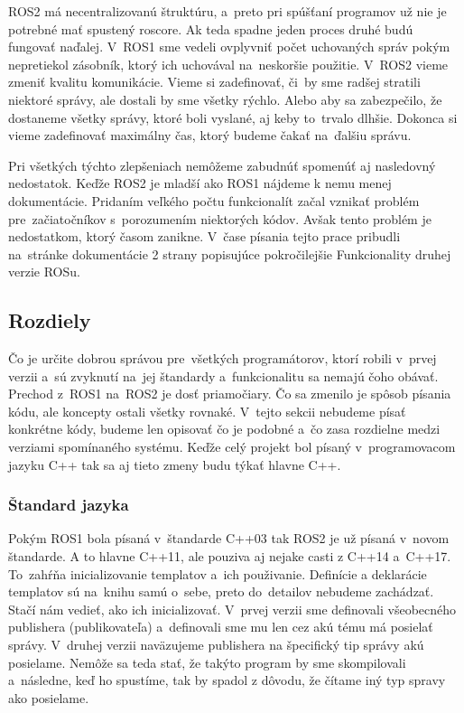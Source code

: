 ROS2 má necentralizovanú štruktúru, a~preto pri spúšťaní programov už nie je potrebné mať spustený roscore. Ak teda spadne jeden proces druhé budú
fungovať naďalej. V~ROS1 sme vedeli ovplyvniť počet uchovaných správ pokým nepretiekol zásobník, ktorý ich uchovával na~neskoršie použitie. V~ROS2
vieme zmeniť kvalitu komunikácie. Vieme si zadefinovať, či~by sme radšej stratili niektoré správy, ale dostali by sme všetky rýchlo. Alebo aby
sa zabezpečilo, že dostaneme všetky správy, ktoré boli vyslané, aj keby to~trvalo dlhšie. Dokonca si vieme zadefinovať maximálny čas, ktorý budeme
čakať na~ďalšiu správu.

Pri všetkých týchto zlepšeniach nemôžeme zabudnúť spomenúť aj nasledovný nedostatok. Keďže ROS2 je mladší ako ROS1 nájdeme k nemu menej dokumentácie.
Pridaním veľkého počtu funkcionalít začal vznikať problém pre~začiatočníkov s~porozumením niektorých kódov. Avšak tento problém je nedostatkom,
ktorý časom zanikne. V~čase písania tejto prace pribudli na~stránke dokumentácie 2 strany popisujúce pokročilejšie Funkcionality druhej verzie ROSu.

\subsection{Rozdiely}

Čo je určite dobrou správou pre~všetkých programátorov, ktorí robili v~prvej verzii a~sú zvyknutí na~jej štandardy a~funkcionalitu sa nemajú
čoho obávať. Prechod z~ROS1 na~ROS2 je dosť priamočiary. Čo sa zmenilo je spôsob písania kódu, ale koncepty ostali všetky rovnaké. V~tejto
sekcii nebudeme písať konkrétne kódy, budeme len opisovať čo je podobné a~čo zasa rozdielne medzi verziami spomínaného systému. Keďže celý
projekt bol písaný v~programovacom jazyku C++ tak sa aj tieto zmeny budu týkať hlavne C++.

\subsubsection{Štandard jazyka}

	Pokým ROS1 bola písaná v~štandarde C++03 tak ROS2 je už písaná v~novom štandarde. A to hlavne C++11, ale pouziva aj nejake casti z C++14
	a~C++17. To~zahŕňa inicializovanie templatov a~ich použivanie. Definície a deklarácie templatov sú na~knihu samú o~sebe, preto do~detailov
	nebudeme zachádzať. Stačí nám vedieť, ako ich inicializovať. V~prvej verzii sme definovali všeobecného publishera (publikovateľa) a~definovali
	sme mu len cez akú tému má posielať správy. V~druhej verzii naväzujeme publishera na špecifický tip správy akú posielame. Nemôže sa teda stať,
	že takýto program by sme skompilovali a~následne, keď ho spustíme, tak by spadol z dôvodu, že čítame iný typ spravy ako posielame.


